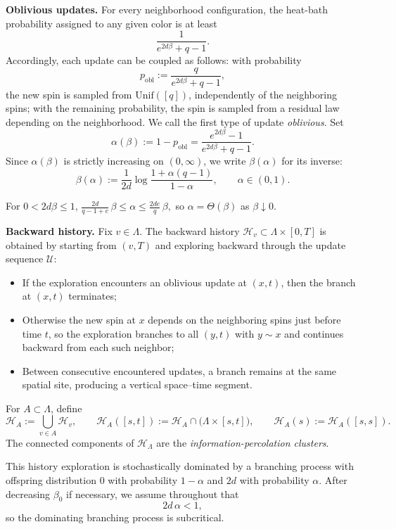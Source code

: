 \documentclass[letterpaper,11pt,reqno]{amsart}
\theoremstyle{definition}
\begin{document}
\smallskip
\noindent\textbf{Oblivious updates.}
For every neighborhood configuration, the heat-bath probability assigned to any given color is at
least
\[
\frac{1}{e^{2d\beta}+q-1}.
\]
Accordingly, each update can be coupled as follows: with probability
\[
p_{\mathrm{obl}}:=\frac{q}{e^{2d\beta}+q-1},
\]
the new spin is sampled from \(\mathrm{Unif}([q])\), independently of the neighboring spins; with
the remaining probability, the spin is sampled from a residual law depending on the neighborhood.
We call the first type of update \emph{oblivious}. Set
\[
\alpha(\beta):=1-p_{\mathrm{obl}}
=
\frac{e^{2d\beta}-1}{e^{2d\beta}+q-1}.
\]
Since \(\alpha(\beta)\) is strictly increasing on \((0,\infty)\), we write \(\beta(\alpha)\) for
its inverse:
\[
\beta(\alpha):=\frac{1}{2d}\log\frac{1+\alpha(q-1)}{1-\alpha},
\qquad
\alpha\in(0,1).
\]

For \(0<2d\beta\le 1\), $\frac{2d}{q-1+e}\,\beta
\le
\alpha
\le
\frac{2de}{q}\,\beta,$
so \(\alpha=\Theta(\beta)\) as \(\beta\downarrow0\).

\smallskip
\noindent\textbf{Backward history.}
Fix \(v\in\Lambda\). The backward history \(\mathcal H_v\subset\Lambda\times[0,T]\) is obtained by
starting from \((v,T)\) and exploring backward through the update sequence \(\mathcal U\):
\begin{itemize}
\item If the exploration encounters an oblivious update at \((x,t)\), then the branch at \((x,t)\)
terminates;
\item Otherwise the new spin at \(x\) depends on the neighboring spins just before time \(t\), so
the exploration branches to all \((y,t)\) with \(y\sim x\) and continues backward from each such
neighbor;
\item Between consecutive encountered updates, a branch remains at the same spatial site, producing a
vertical space--time segment.
\end{itemize}
For \(A\subset\Lambda\), define
\[
\mathcal H_A:=\bigcup_{v\in A}\mathcal H_v,
\qquad
\mathcal H_A([s,t]):=
\mathcal H_A\cap \big(\Lambda\times[s,t]\big),\qquad
\mathcal H_A(s):=\mathcal H_A([s,s]).
\]
The connected components of \(\mathcal H_\Lambda\) are the \emph{information-percolation clusters}.

This history exploration is stochastically dominated by a branching process with offspring
distribution \(0\) with probability \(1-\alpha\) and \(2d\) with probability \(\alpha\). After
decreasing \(\beta_0\) if necessary, we assume throughout that
\[
{2d\,\alpha<1,}
\]
so the dominating branching process is subcritical.
\end{document}
